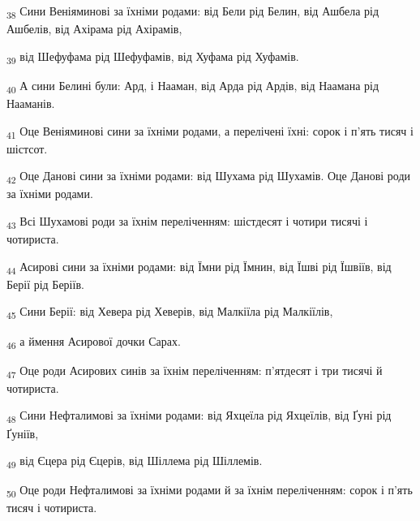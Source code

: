 \begin{tcolorbox}
\textsubscript{38} Сини Веніяминові за їхніми родами: від Бели рід Белин, від Ашбела рід Ашбелів, від Ахірама рід Ахірамів,
\end{tcolorbox}
\begin{tcolorbox}
\textsubscript{39} від Шефуфама рід Шефуфамів, від Хуфама рід Хуфамів.
\end{tcolorbox}
\begin{tcolorbox}
\textsubscript{40} А сини Белині були: Ард, і Нааман, від Арда рід Ардів, від Наамана рід Нааманів.
\end{tcolorbox}
\begin{tcolorbox}
\textsubscript{41} Оце Веніяминові сини за їхніми родами, а перелічені їхні: сорок і п'ять тисяч і шістсот.
\end{tcolorbox}
\begin{tcolorbox}
\textsubscript{42} Оце Данові сини за їхніми родами: від Шухама рід Шухамів. Оце Данові роди за їхніми родами.
\end{tcolorbox}
\begin{tcolorbox}
\textsubscript{43} Всі Шухамові роди за їхнім переліченням: шістдесят і чотири тисячі і чотириста.
\end{tcolorbox}
\begin{tcolorbox}
\textsubscript{44} Асирові сини за їхніми родами: від Їмни рід Їмнин, від Їшві рід Їшвіїв, від Берії рід Беріїв.
\end{tcolorbox}
\begin{tcolorbox}
\textsubscript{45} Сини Берії: від Хевера рід Хеверів, від Малкіїла рід Малкіїлів,
\end{tcolorbox}
\begin{tcolorbox}
\textsubscript{46} а ймення Асирової дочки Сарах.
\end{tcolorbox}
\begin{tcolorbox}
\textsubscript{47} Оце роди Асирових синів за їхнім переліченням: п'ятдесят і три тисячі й чотириста.
\end{tcolorbox}
\begin{tcolorbox}
\textsubscript{48} Сини Нефталимові за їхніми родами: від Яхцеїла рід Яхцеїлів, від Ґуні рід Ґуніїв,
\end{tcolorbox}
\begin{tcolorbox}
\textsubscript{49} від Єцера рід Єцерів, від Шіллема рід Шіллемів.
\end{tcolorbox}
\begin{tcolorbox}
\textsubscript{50} Оце роди Нефталимові за їхніми родами й за їхнім переліченням: сорок і п'ять тисяч і чотириста.
\end{tcolorbox}
